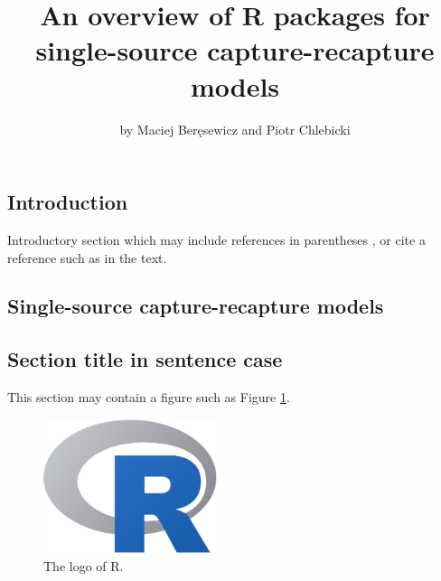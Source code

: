 \title{An overview of R packages for single-source capture-recapture
models}
\author{by Maciej Beręsewicz and Piotr Chlebicki}

\maketitle


\hypertarget{introduction}{%
\subsection{Introduction}\label{introduction}}

Introductory section which may include references in parentheses
\citep{R}, or cite a reference such as \citet{R} in the text.

\hypertarget{single-source-capture-recapture-models}{%
\subsection{Single-source capture-recapture
models}\label{single-source-capture-recapture-models}}

\hypertarget{section-title-in-sentence-case}{%
\subsection{Section title in sentence
case}\label{section-title-in-sentence-case}}

This section may contain a figure such as Figure \ref{fig:Rlogo}.

\begin{Schunk}
\begin{figure}[htbp]

{\centering \includegraphics[width=2in]{Rlogo} 

}

\caption[The logo of R]{The logo of R.}\label{fig:Rlogo}
\end{figure}
\end{Schunk}

